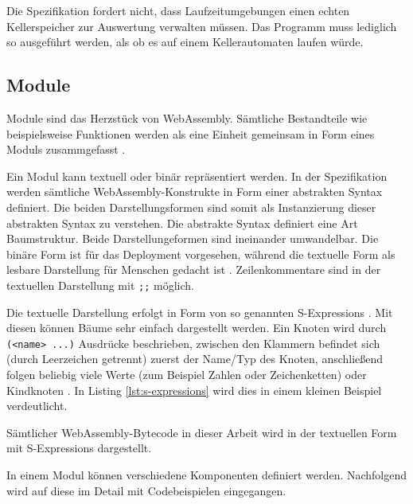 Die Spezifikation fordert nicht, dass Laufzeitumgebungen einen echten Kellerspeicher zur Auswertung verwalten müssen. Das Programm muss lediglich so ausgeführt werden, als ob es auf einem Kellerautomaten laufen würde.

\subsection{Module}
\label{subsec:WebAssembly-Module}
Module sind das Herzstück von WebAssembly. Sämtliche Bestandteile wie beispielsweise Funktionen werden als eine Einheit gemeinsam in Form eines Moduls zusammgefasst \cite{WebAssemblySpecification}.

Ein Modul kann textuell oder binär repräsentiert werden. In der Spezifikation werden sämtliche WebAssembly-Konstrukte in Form einer abstrakten Syntax definiert. Die beiden Darstellungsformen sind somit als Instanzierung dieser abstrakten Syntax zu verstehen. Die abstrakte Syntax definiert eine Art Baumstruktur. Beide Darstellungeformen sind ineinander umwandelbar. Die binäre Form ist für das Deployment vorgesehen, während die textuelle Form als lesbare Darstellung für Menschen gedacht ist \cite{WebAssemblySpecification} \cite{MDNWebAssembly}. Zeilenkommentare sind in der textuellen Darstellung mit \lstinline{;;} möglich.

Die textuelle Darstellung erfolgt in Form von so genannten S-Expressions \cite{WebAssemblySpecification}. Mit diesen können Bäume sehr einfach dargestellt werden. Ein Knoten wird durch \lstinline{(<name> ...)} Ausdrücke beschrieben, zwischen den Klammern befindet sich (durch Leerzeichen getrennt) zuerst der Name/Typ des Knoten, anschließend folgen beliebig viele Werte (zum Beispiel Zahlen oder Zeichenketten) oder Kindknoten \cite{MDNWebAssembly}. In Listing \ref{lst:s-expressions} wird dies in einem kleinen Beispiel verdeutlicht.



Sämtlicher WebAssembly-Bytecode in dieser Arbeit wird in der textuellen Form mit S-Expressions dargestellt.

In einem Modul können verschiedene Komponenten definiert werden. Nachfolgend wird auf diese im Detail mit Codebeispielen eingegangen.

